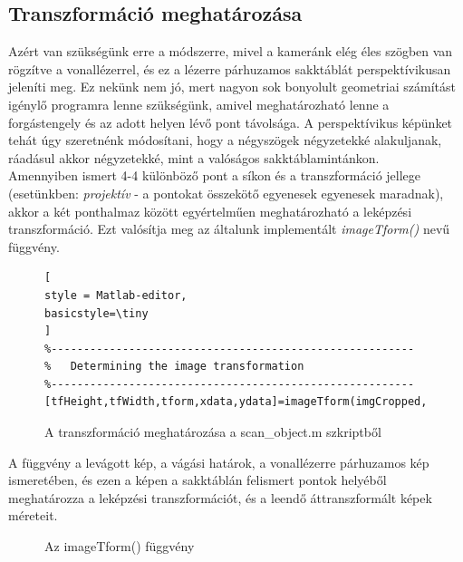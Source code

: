 \documentclass[12pt,a4paper]{article}
\begin{document}
\subsection{Transzformáció meghatározása}
Azért van szükségünk erre a módszerre, mivel a kameránk elég éles szögben van rögzítve a vonallézerrel, és ez a lézerre párhuzamos sakktáblát perspektívikusan jeleníti meg. Ez nekünk nem jó, mert nagyon sok bonyolult geometriai számítást igénylő programra lenne szükségünk, amivel meghatározható lenne a forgástengely és az adott helyen lévő pont távolsága. A perspektívikus képünket tehát úgy szeretnénk módosítani, hogy a négyszögek négyzetekké alakuljanak, ráadásul akkor négyzetekké, mint a valóságos sakktáblamintánkon.\\[10pt]
Amennyiben ismert 4-4 különböző pont a síkon és a transzformáció jellege (esetünkben: \textit{projektív} - a pontokat összekötő egyenesek egyenesek maradnak), akkor a két ponthalmaz között egyértelműen meghatározható a leképzési transzformáció. Ezt valósítja meg az általunk implementált \textit{imageTform()} nevű függvény.\\[10pt]
\begin{figure}[h!]
\centering
\begin{lstlisting}[
style = Matlab-editor,
basicstyle=\tiny
]
%--------------------------------------------------------
%   Determining the image transformation
%--------------------------------------------------------
[tfHeight,tfWidth,tform,xdata,ydata]=imageTform(imgCropped,rect,paralellImageNumber,cameraParams);
\end{lstlisting}
\caption{A transzformáció meghatározása a scan\_object.m szkriptből}
\end{figure}
A függvény a levágott kép, a vágási határok, a vonallézerre párhuzamos kép ismeretében, és ezen a képen a sakktáblán felismert pontok helyéből meghatározza a leképzési transzformációt, és a leendő áttranszformált képek méreteit.
\begin{figure}
\centering

\caption{Az imageTform() függvény}
\end{figure}

\end{document}
